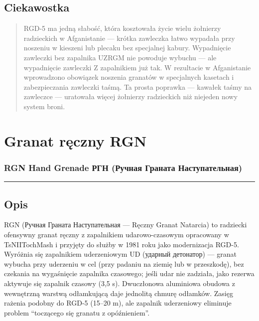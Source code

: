 \documentclass[12pt,openany,oneside]{book}
\begin{document}
\section{Ciekawostka}\label{ciekawostka-102}

\begin{quote}
RGD-5 ma jedną słabość, która kosztowała życie wielu żołnierzy
radzieckich w Afganistanie --- krótka zawleczka łatwo wypadała przy
noszeniu w kieszeni lub plecaku bez specjalnej kabury. Wypadnięcie
zawleczki bez zapalnika UZRGM nie powoduje wybuchu --- ale wypadnięcie
zawleczki Z zapalnikiem już tak. W rezultacie w Afganistanie wprowadzono
obowiązek noszenia granatów w specjalnych kasetach i zabezpieczania
zawleczki taśmą. Ta prosta poprawka --- kawałek taśmy na zawleczce ---
uratowała więcej żołnierzy radzieckich niż niejeden nowy system broni.
\end{quote}

\chapter{Granat ręczny RGN}\label{granat-rux119czny-rgn}

\subsection{RGN Hand Grenade \textbar{} РГН (Ручная Граната
Наступательная)}\label{rgn-hand-grenade-ux440ux433ux43d-ux440ux443ux447ux43dux430ux44f-ux433ux440ux430ux43dux430ux442ux430-ux43dux430ux441ux442ux443ux43fux430ux442ux435ux43bux44cux43dux430ux44f}

\begin{center}\rule{0.5\linewidth}{0.5pt}\end{center}

\section{Opis}\label{opis-103}

RGN (Ручная Граната Наступательная --- Ręczny Granat Natarcia) to
radziecki ofensywny granat ręczny z zapalnikiem udarowo-czasowym
opracowany w TsNIITochMash i przyjęty do służby w 1981 roku jako
modernizacja RGD-5. Wyróżnia się zapalnikiem uderzeniowym UD (ударный
детонатор) --- granat wybucha przy uderzeniu w cel (przy padaniu na
ziemię lub w przeszkodę), bez czekania na wygaśnięcie zapalnika
czasowego; jeśli udar nie zadziała, jako rezerwa aktywuje się zapalnik
czasowy (3,5 s). Dwuczłonowa aluminiowa obudowa z wewnętrzną warstwą
odłamkującą daje jednolitą chmurę odłamków. Zasięg rażenia podobny do
RGD-5 (15--20 m), ale zapalnik uderzeniowy eliminuje problem ``toczącego
się granatu z opóźnieniem''.
\end{document}
